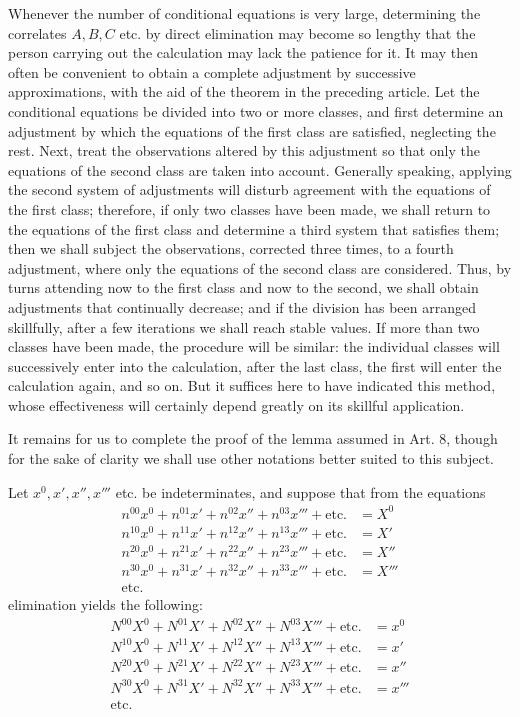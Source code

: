 Whenever the number of conditional equations is very large, determining the correlates \(A,B,C\) etc. by direct elimination may become so lengthy that the person carrying out the calculation may lack the patience for it. It may then often be convenient to obtain a complete adjustment by successive approximations, with the aid of the theorem in the preceding article. Let the conditional equations be divided into two or more classes, and first determine an adjustment by which the equations of the first class are satisfied, neglecting the rest. Next, treat the observations altered by this adjustment so that only the equations of the second class are taken into account. Generally speaking, applying the second system of adjustments will disturb agreement with the equations of the first class; therefore, if only two classes have been made, we shall return to the equations of the first class and determine a third system that satisfies them; then we shall subject the observations, corrected three times, to a fourth adjustment,
where only the equations of the second class are considered. Thus, by turns attending now to the first class and now to the second, we shall obtain adjustments that continually decrease; and if the division has been arranged skillfully, after a few iterations we shall reach stable values. If more than two classes have been made, the procedure will be similar: the individual classes will successively enter into the calculation, after the last class, the first will enter the calculation again, and so on. But it suffices here to have indicated this method, whose effectiveness will certainly depend greatly on its skillful application.

It remains for us to complete the proof of the lemma assumed in Art. 8, though for the sake of clarity we shall use other notations better suited to this subject.

Let \(x^0,x',x'',x'''\) etc. be indeterminates, and suppose that from the equations
\[
\begin{aligned}
n^{00}x^0+n^{01}x'+n^{02}x''+n^{03}x'''+\text{etc.}&=X^0\\
n^{10}x^0+n^{11}x'+n^{12}x''+n^{13}x'''+\text{etc.}&=X'\\
n^{20}x^0+n^{21}x'+n^{22}x''+n^{23}x'''+\text{etc.}&=X''\\
n^{30}x^0+n^{31}x'+n^{32}x''+n^{33}x'''+\text{etc.}&=X'''\\
\text{etc.}&
\end{aligned}
\]
elimination yields the following:
\[
\begin{aligned}
N^{00}X^0+N^{01}X'+N^{02}X''+N^{03}X'''+\text{etc.}&=x^0\\
N^{10}X^0+N^{11}X'+N^{12}X''+N^{13}X'''+\text{etc.}&=x'\\
N^{20}X^0+N^{21}X'+N^{22}X''+N^{23}X'''+\text{etc.}&=x''\\
N^{30}X^0+N^{31}X'+N^{32}X''+N^{33}X'''+\text{etc.}&=x'''\\
\text{etc.}&
\end{aligned}
\]

